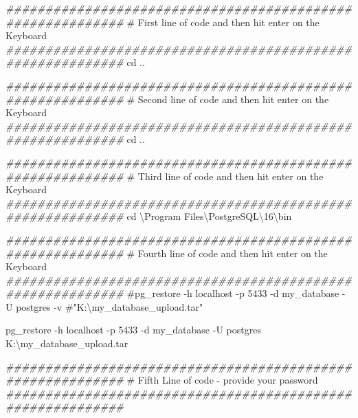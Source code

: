 \documentclass[
  letterpaper,
  DIV=11,
  numbers=noendperiod]{scrreprt}
\newenvironment{Shaded}{\begin{snugshade}}{\end{snugshade}}
\newcommand{\CommentTok}[1]{\textcolor[rgb]{0.37,0.37,0.37}{#1}}
\newcommand{\DecValTok}[1]{\textcolor[rgb]{0.68,0.00,0.00}{#1}}
\newcommand{\DocumentationTok}[1]{\textcolor[rgb]{0.37,0.37,0.37}{\textit{#1}}}
\newcommand{\NormalTok}[1]{\textcolor[rgb]{0.00,0.23,0.31}{#1}}
\newcommand{\SpecialCharTok}[1]{\textcolor[rgb]{0.37,0.37,0.37}{#1}}
\begin{document}
\begin{Shaded}
\begin{Highlighting}[]
\DocumentationTok{\#\#\#\#\#\#\#\#\#\#\#\#\#\#\#\#\#\#\#\#\#\#\#\#\#\#\#\#\#\#\#\#\#\#\#\#\#\#\#\#\#\#\#\#\#\#\#\#\#\#\#\#\#\#\#\#\#\#\#}
\CommentTok{\# First line of code and then hit enter on the Keyboard}
\DocumentationTok{\#\#\#\#\#\#\#\#\#\#\#\#\#\#\#\#\#\#\#\#\#\#\#\#\#\#\#\#\#\#\#\#\#\#\#\#\#\#\#\#\#\#\#\#\#\#\#\#\#\#\#\#\#\#\#\#\#\#\#}
\NormalTok{cd ..}

\DocumentationTok{\#\#\#\#\#\#\#\#\#\#\#\#\#\#\#\#\#\#\#\#\#\#\#\#\#\#\#\#\#\#\#\#\#\#\#\#\#\#\#\#\#\#\#\#\#\#\#\#\#\#\#\#\#\#\#\#\#\#\#}
\CommentTok{\# Second line of code and then hit enter on the Keyboard}
\DocumentationTok{\#\#\#\#\#\#\#\#\#\#\#\#\#\#\#\#\#\#\#\#\#\#\#\#\#\#\#\#\#\#\#\#\#\#\#\#\#\#\#\#\#\#\#\#\#\#\#\#\#\#\#\#\#\#\#\#\#\#\#}
\NormalTok{cd ..}

\DocumentationTok{\#\#\#\#\#\#\#\#\#\#\#\#\#\#\#\#\#\#\#\#\#\#\#\#\#\#\#\#\#\#\#\#\#\#\#\#\#\#\#\#\#\#\#\#\#\#\#\#\#\#\#\#\#\#\#\#\#\#\#}
\CommentTok{\# Third line of code and then hit enter on the Keyboard}
\DocumentationTok{\#\#\#\#\#\#\#\#\#\#\#\#\#\#\#\#\#\#\#\#\#\#\#\#\#\#\#\#\#\#\#\#\#\#\#\#\#\#\#\#\#\#\#\#\#\#\#\#\#\#\#\#\#\#\#\#\#\#\#}
\NormalTok{cd \textbackslash{}Program Files\textbackslash{}PostgreSQL\textbackslash{}}\DecValTok{16}\NormalTok{\textbackslash{}bin}

\DocumentationTok{\#\#\#\#\#\#\#\#\#\#\#\#\#\#\#\#\#\#\#\#\#\#\#\#\#\#\#\#\#\#\#\#\#\#\#\#\#\#\#\#\#\#\#\#\#\#\#\#\#\#\#\#\#\#\#\#\#\#\#}
\CommentTok{\# Fourth line of code and then hit enter on the Keyboard}
\DocumentationTok{\#\#\#\#\#\#\#\#\#\#\#\#\#\#\#\#\#\#\#\#\#\#\#\#\#\#\#\#\#\#\#\#\#\#\#\#\#\#\#\#\#\#\#\#\#\#\#\#\#\#\#\#\#\#\#\#\#\#\#}
\CommentTok{\#pg\_restore {-}h localhost {-}p 5433 {-}d my\_database {-}U postgres {-}v \#"K:\textbackslash{}my\_database\_upload.tar"}

\NormalTok{pg\_restore }\SpecialCharTok{{-}}\NormalTok{h localhost }\SpecialCharTok{{-}}\NormalTok{p }\DecValTok{5433} \SpecialCharTok{{-}}\NormalTok{d my\_database }\SpecialCharTok{{-}}\NormalTok{U postgres K}\SpecialCharTok{:}\NormalTok{\textbackslash{}my\_database\_upload.tar}

\DocumentationTok{\#\#\#\#\#\#\#\#\#\#\#\#\#\#\#\#\#\#\#\#\#\#\#\#\#\#\#\#\#\#\#\#\#\#\#\#\#\#\#\#\#\#\#\#\#\#\#\#\#\#\#\#\#\#\#\#\#\#\#}
\CommentTok{\# Fifth Line of code {-} provide your password}
\DocumentationTok{\#\#\#\#\#\#\#\#\#\#\#\#\#\#\#\#\#\#\#\#\#\#\#\#\#\#\#\#\#\#\#\#\#\#\#\#\#\#\#\#\#\#\#\#\#\#\#\#\#\#\#\#\#\#\#\#\#\#\#}
\end{Highlighting}
\end{Shaded}
\end{document}
